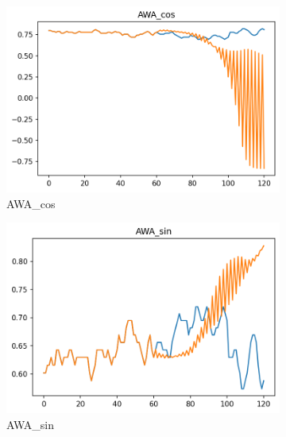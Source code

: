 \documentclass[12pt,twoside]{report}
\begin{document}
\begin{figure}[h]
     \centering
     \begin{subfigure}[b]{0.32\textwidth}
         \centering
         \includegraphics[width=\textwidth]{figures/prediction-plots/AWA_cos.png}
         \caption{AWA\_cos}
     \end{subfigure}
     \begin{subfigure}[b]{0.32\textwidth}
         \centering
         \includegraphics[width=\textwidth]{figures/prediction-plots/AWA_sin.png}
         \caption{AWA\_sin}
     \end{subfigure}
     \begin{subfigure}[b]{0.32\textwidth}
         \centering

\end{subfigure}
\end{figure}
\end{document}
